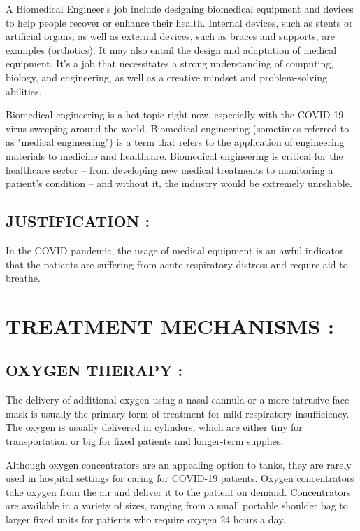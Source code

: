 \documentclass[12pt]{article}
\begin{document}
A Biomedical Engineer's job include designing biomedical equipment and devices to help people recover or enhance their health. Internal devices, such as stents or artificial organs, as well as external devices, such as braces and supports, are examples (orthotics). It may also entail the design and adaptation of medical equipment. It's a job that necessitates a strong understanding of computing, biology, and engineering, as well as a creative mindset and problem-solving abilities.



Biomedical engineering is a hot topic right now, especially with the COVID-19 virus sweeping around the world. Biomedical engineering (sometimes referred to as "medical engineering") is a term that refers to the application of engineering materials to medicine and healthcare. Biomedical engineering is critical for the healthcare sector – from developing new medical treatments to monitoring a patient's condition – and without it, the industry would be extremely unreliable.




\subsection{JUSTIFICATION :}


In the COVID pandemic, the usage of medical equipment is an awful indicator that the patients are suffering from acute respiratory distress and require aid to breathe.


\section{TREATMENT MECHANISMS :}


\subsection{OXYGEN THERAPY :}
The delivery of additional oxygen using a nasal cannula or a more intrusive face mask is usually the primary form of treatment for mild respiratory insufficiency. The oxygen is usually delivered in cylinders, which are either tiny for transportation or big for fixed patients and longer-term supplies.

Although oxygen concentrators are an appealing option to tanks, they are rarely used in hospital settings for caring for COVID-19 patients. Oxygen concentrators take oxygen from the air and deliver it to the patient on demand. Concentrators are available in a variety of sizes, ranging from a small portable shoulder bag to larger fixed units for patients who require oxygen 24 hours a day.
\end{document}
